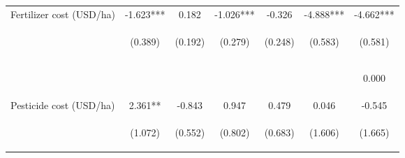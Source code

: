 \begin{center}
\begin{tabular}{lcccccc}
Fertilizer cost (USD/ha) & -1.623*** & 0.182 & -1.026*** & -0.326 & -4.888*** & -4.662*** \\
 & \begin{footnotesize}(0.389)\end{footnotesize} & \begin{footnotesize}(0.192)\end{footnotesize} & \begin{footnotesize}(0.279)\end{footnotesize} & \begin{footnotesize}(0.248)\end{footnotesize} & \begin{footnotesize}(0.583)\end{footnotesize} & \begin{footnotesize}(0.581)\end{footnotesize} \\
\vspace{4pt} & \begin{footnotesize}[0.000]\end{footnotesize} & \begin{footnotesize}[0.345]\end{footnotesize} & \begin{footnotesize}[0.000]\end{footnotesize} & \begin{footnotesize}[0.188]\end{footnotesize} & \begin{footnotesize}[0.000]\end{footnotesize} & \begin{footnotesize}0.000\end{footnotesize} \\
Pesticide cost (USD/ha) & 2.361** & -0.843 & 0.947 & 0.479 & 0.046 & -0.545 \\
 & \begin{footnotesize}(1.072)\end{footnotesize} & \begin{footnotesize}(0.552)\end{footnotesize} & \begin{footnotesize}(0.802)\end{footnotesize} & \begin{footnotesize}(0.683)\end{footnotesize} & \begin{footnotesize}(1.606)\end{footnotesize} & \begin{footnotesize}(1.665)\end{footnotesize} \\

\end{tabular}
\end{center}
